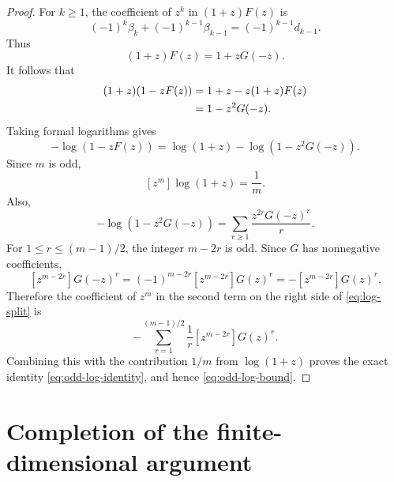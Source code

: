 \documentclass[11pt]{article}
\begin{document}
\begin{proof}
For $k\ge1$, the coefficient of $z^k$ in $(1+z)F(z)$ is
\[
   (-1)^k\beta_k+(-1)^{k-1}\beta_{k-1}
   =(-1)^{k-1}d_{k-1}.
\]
Thus
\begin{equation}
   (1+z)F(z)=1+zG(-z).
   \label{eq:FG}
\end{equation}
It follows that
\begin{align}
   (1+z)(1-zF(z))
   &=1+z-z(1+z)F(z)\notag\\
   &=1-z^2G(-z).
   \label{eq:factor-log}
\end{align}
Taking formal logarithms gives
\begin{equation}
   -\log(1-zF(z))
   =\log(1+z)-\log(1-z^2G(-z)).
   \label{eq:log-split}
\end{equation}
Since $m$ is odd,
\[
   [z^m]\log(1+z)=\frac1m.
\]
Also,
\begin{equation}
   -\log(1-z^2G(-z))
   =\sum_{r\ge1}\frac{z^{2r}G(-z)^r}{r}.
   \label{eq:second-log}
\end{equation}
For $1\le r\le(m-1)/2$, the integer $m-2r$ is odd.  Since $G$ has nonnegative coefficients,
\[
   [z^{m-2r}]G(-z)^r
   =(-1)^{m-2r}[z^{m-2r}]G(z)^r
   =-[z^{m-2r}]G(z)^r.
\]
Therefore the coefficient of $z^m$ in the second term on the right side of \eqref{eq:log-split} is
\[
   -\sum_{r=1}^{(m-1)/2}\frac1r[z^{m-2r}]G(z)^r.
\]
Combining this with the contribution $1/m$ from $\log(1+z)$ proves the exact identity \eqref{eq:odd-log-identity}, and hence \eqref{eq:odd-log-bound}.
\end{proof}

\section{Completion of the finite-dimensional argument}
\end{document}
